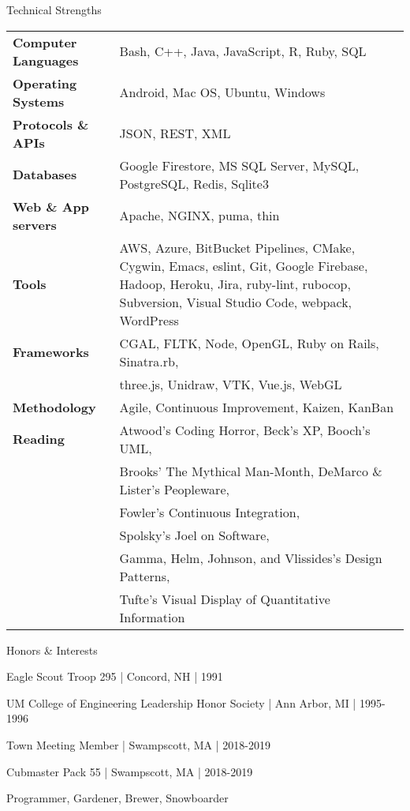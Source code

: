\documentclass{resume}
\begin{document}
\begin{rSection}{Technical Strengths}
\begin{tabular}{ @{} >{\bfseries}l @{\hspace{6ex}} l }
Computer Languages & Bash, C++, Java, JavaScript, R, Ruby, SQL \\
Operating Systems & Android, Mac OS, Ubuntu, Windows \\
Protocols \& APIs & JSON, REST, XML \\
Databases & Google Firestore, MS SQL Server, MySQL, PostgreSQL, Redis, Sqlite3 \\
Web \& App servers & Apache, NGINX, puma, thin \\
Tools & AWS, Azure, BitBucket Pipelines, CMake, Cygwin, Emacs, eslint, Git, Google Firebase, Hadoop, Heroku, Jira, ruby-lint, rubocop, Subversion, Visual Studio Code, webpack, WordPress \\
Frameworks & CGAL, FLTK, Node, OpenGL, Ruby on Rails, Sinatra.rb, \\
 & three.js, Unidraw, VTK, Vue.js, WebGL \\
Methodology & Agile, Continuous Improvement, Kaizen, KanBan \\
Reading & Atwood's Coding Horror, Beck's XP, Booch's UML, \\
 & Brooks' The Mythical Man-Month, DeMarco \& Lister's Peopleware, \\
 & Fowler's Continuous Integration, \\
 & Spolsky's Joel on Software, \\
 & Gamma, Helm, Johnson, and Vlissides's Design Patterns, \\
 & Tufte's Visual Display of Quantitative Information
\end{tabular}
\end{rSection}

\begin{rSection}{Honors \& Interests}
\item Eagle Scout Troop 295 | Concord, NH | 1991
\item UM College of Engineering Leadership Honor Society | Ann Arbor, MI | 1995-1996
\item Town Meeting Member | Swampscott, MA | 2018-2019 
\item Cubmaster Pack 55 | Swampscott, MA | 2018-2019 
\item Programmer, Gardener, Brewer, Snowboarder
\end{rSection}
\end{document}
